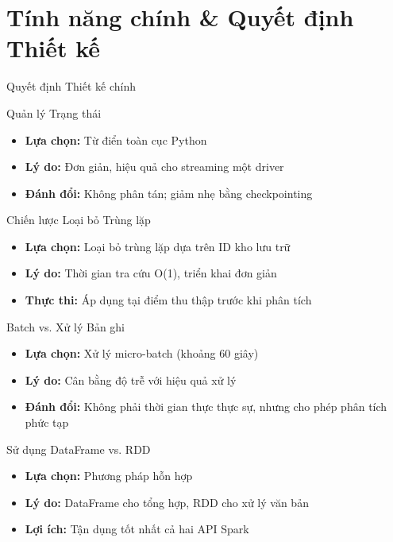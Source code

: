 \documentclass[aspectratio=169]{beamer}
\begin{document}
\section{Tính năng chính \& Quyết định Thiết kế}

\begin{frame}{Quyết định Thiết kế chính}
    \begin{block}{Quản lý Trạng thái}
        \begin{itemize}
            \item \textbf{Lựa chọn:} Từ điển toàn cục Python
            \item \textbf{Lý do:} Đơn giản, hiệu quả cho streaming một driver
            \item \textbf{Đánh đổi:} Không phân tán; giảm nhẹ bằng checkpointing
        \end{itemize}
    \end{block}
    
    \begin{block}{Chiến lược Loại bỏ Trùng lặp}
        \begin{itemize}
            \item \textbf{Lựa chọn:} Loại bỏ trùng lặp dựa trên ID kho lưu trữ
            \item \textbf{Lý do:} Thời gian tra cứu O(1), triển khai đơn giản
            \item \textbf{Thực thi:} Áp dụng tại điểm thu thập trước khi phân tích
        \end{itemize}
    \end{block}
    
    \begin{block}{Batch vs. Xử lý Bản ghi}
        \begin{itemize}
            \item \textbf{Lựa chọn:} Xử lý micro-batch (khoảng 60 giây)
            \item \textbf{Lý do:} Cân bằng độ trễ với hiệu quả xử lý
            \item \textbf{Đánh đổi:} Không phải thời gian thực thực sự, nhưng cho phép phân tích phức tạp
        \end{itemize}
    \end{block}
    
    \begin{block}{Sử dụng DataFrame vs. RDD}
        \begin{itemize}
            \item \textbf{Lựa chọn:} Phương pháp hỗn hợp
            \item \textbf{Lý do:} DataFrame cho tổng hợp, RDD cho xử lý văn bản
            \item \textbf{Lợi ích:} Tận dụng tốt nhất cả hai API Spark
        \end{itemize}
    \end{block}
\end{frame}
\end{document}

